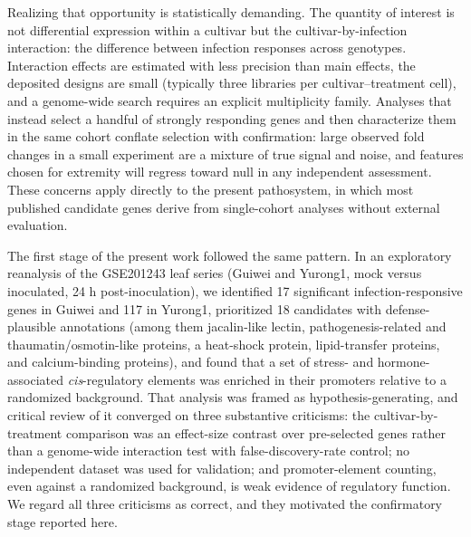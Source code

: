 \documentclass[12pt,letterpaper]{article}
\begin{document}
Realizing that opportunity is statistically demanding. The quantity of interest is not differential expression within a cultivar but the cultivar-by-infection interaction: the difference between infection responses across genotypes. Interaction effects are estimated with less precision than main effects, the deposited designs are small (typically three libraries per cultivar–treatment cell), and a genome-wide search requires an explicit multiplicity family. Analyses that instead select a handful of strongly responding genes and then characterize them in the same cohort conflate selection with confirmation: large observed fold changes in a small experiment are a mixture of true signal and noise, and features chosen for extremity will regress toward null in any independent assessment. These concerns apply directly to the present pathosystem, in which most published candidate genes derive from single-cohort analyses without external evaluation.

The first stage of the present work followed the same pattern. In an exploratory reanalysis of the GSE201243 leaf series (Guiwei and Yurong1, mock versus inoculated, 24 h post-inoculation), we identified 17 significant infection-responsive genes in Guiwei and 117 in Yurong1, prioritized 18 candidates with defense-plausible annotations (among them jacalin-like lectin, pathogenesis-related and thaumatin/osmotin-like proteins, a heat-shock protein, lipid-transfer proteins, and calcium-binding proteins), and found that a set of stress- and hormone-associated \textit{cis}-regulatory elements was enriched in their promoters relative to a randomized background. That analysis was framed as hypothesis-generating, and critical review of it converged on three substantive criticisms: the cultivar-by-treatment comparison was an effect-size contrast over pre-selected genes rather than a genome-wide interaction test with false-discovery-rate control; no independent dataset was used for validation; and promoter-element counting, even against a randomized background, is weak evidence of regulatory function. We regard all three criticisms as correct, and they motivated the confirmatory stage reported here.
\end{document}

